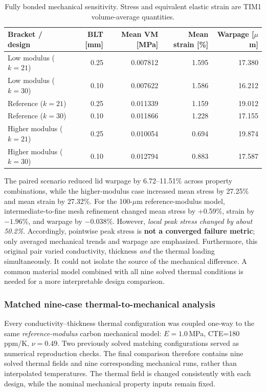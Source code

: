 \documentclass[10pt,a4paper]{article}
\begin{document}
\begin{table}[htbp]\centering
\caption{Fully bonded mechanical sensitivity. Stress and equivalent elastic strain are TIM1 volume-average quantities.}
\label{tab:v4d}
\small
\begin{tabular}{@{}lrrrr@{}}\toprule
Bracket / design & BLT [mm] & Mean VM [MPa] & Mean strain [\%] & Warpage [$\mu$m]\\\midrule
Low modulus ($k=21$) & 0.25 & 0.007812 & 1.595 & 17.380\\
Low modulus ($k=30$) & 0.10 & 0.007622 & 1.586 & 16.212\\
Reference ($k=21$) & 0.25 & 0.011339 & 1.159 & 19.012\\
Reference ($k=30$) & 0.10 & 0.011866 & 1.228 & 17.155\\
Higher modulus ($k=21$) & 0.25 & 0.010054 & 0.694 & 19.874\\
Higher modulus ($k=30$) & 0.10 & 0.012794 & 0.883 & 17.587\\\bottomrule
\end{tabular}
\end{table}
\FloatBarrier
The paired scenario reduced lid warpage by 6.72--11.51\% across property combinations,
while the higher-modulus case increased mean stress by 27.25\% and mean strain by 27.32\%.
For the 100-$\mu$m reference-modulus model, intermediate-to-fine mesh refinement changed
mean stress by +0.59\%, strain by $-1.96$\%, and warpage by $-0.038$\%.
However, \emph{local peak stress changed by about 50.2\%}. Accordingly, pointwise peak
stress is \textbf{not a converged failure metric}; only averaged mechanical trends and
warpage are emphasized. Furthermore, this original pair varied conductivity,
thickness \emph{and} the thermal loading simultaneously.
It could not isolate the source of the mechanical difference.
A common material model combined with all nine solved thermal conditions is needed
for a more interpretable design comparison.

\subsubsection{Matched nine-case thermal-to-mechanical analysis}
Every conductivity--thickness thermal configuration was coupled one-way to
the same \emph{reference-modulus} carbon mechanical model:
$E=1.0$\,MPa, CTE=180\,ppm/K, $\nu=0.49$.
Two previously solved matching configurations served as numerical reproduction checks.
The final comparison therefore contains nine solved thermal fields
and nine corresponding mechanical runs, rather than interpolated temperatures.
The thermal field is changed consistently with each design, while the nominal mechanical
property inputs remain fixed.
\end{document}

